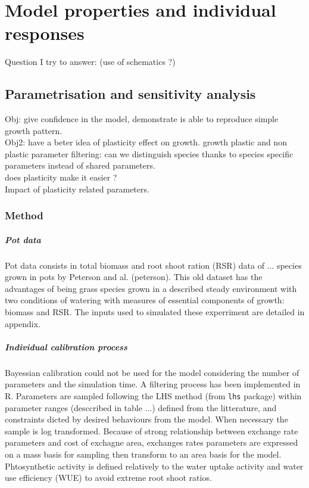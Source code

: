 
\chapter{Model properties and individual responses}
Question I try to answer: (use of schematics ?)


\section{Parametrisation and sensitivity analysis}
Obj: give confidence in the model, demonstrate is able to reproduce simple growth pattern.\\
Obj2: have a beter idea of plasticity effect on growth.
growth plastic and non plastic parameter filtering: can we distinguish species thanks to species specific parameters instead of shared parameters.\\
does plasticity make it easier ?\\
Impact of plasticity related parameters.\\

\subsection{Method}

\paragraph{Pot data}
Pot data consists in total biomass and root shoot ration (RSR) data of ... species grown in pots by Peterson and al. (peterson). This old dataset has the advantages of being grass species grown in a described steady environment with two conditions of watering with measures of essential components of growth: biomass and RSR. The inputs used to simulated these experriment are detailed in appendix.

\paragraph{Individual calibration process}
Bayessian calibration could not be used for the model considering the number of parameters and the simulation time. A filtering process has been implemented in R. Parameters are sampled following the LHS method (from \texttt{lhs} package)	within parameter ranges (desccribed in table ...) defined from the litterature, and constraints dicted by desired behaviours from the model. When necessary the sample is log transformed. Because of strong relationship between exchange rate parameters and cost of exchagne area, exchanges rates parameters are expressed on a mass basis for sampling then transform to an area basis for the model. Phtosynthetic activity is defined relatively to the water uptake activity and water use efficiency (WUE) to avoid extreme root shoot ratios.\\

